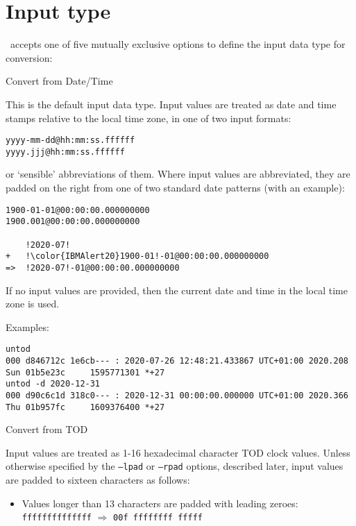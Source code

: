 \documentclass[a4paper,12pt,oneside,openany]{memoir}
\begin{document}
\section{Input type}

\tpname\ accepts one of five mutually exclusive options
to define the input data type for conversion:
\begin{description}[format=\ttfamily]
  \item[-d,--date] Convert from Date/Time

  This is the default input data type.
  Input values are treated as date and time stamps
  relative to the local time zone,
  in one of two input formats:
\begin{lstlisting}[style=plain]
yyyy-mm-dd@hh:mm:ss.ffffff
yyyy.jjj@hh:mm:ss.ffffff
\end{lstlisting}
  or `sensible' abbreviations of them.
  Where input values are abbreviated,
  they are padded on the right
  from one of two standard date patterns
  (with an example):
\begin{lstlisting}[style=plain]
1900-01-01@00:00:00.000000000
1900.001@00:00:00.000000000

    !2020-07!
+   !\color{IBMAlert20}1900-01!-01@00:00:00.000000000
=>  !2020-07!-01@00:00:00.000000000
\end{lstlisting}

  If no input values are provided,
  then the current date and time in the local time zone
  is used.

  Examples:
  \begin{lstlisting}[style=xtermsmall,numbers=none]
untod
000 d846712c 1e6cb--- : 2020-07-26 12:48:21.433867 UTC+01:00 2020.208 Sun 01b5e23c     1595771301 *+27
untod -d 2020-12-31
000 d90c6c1d 318c0--- : 2020-12-31 00:00:00.000000 UTC+01:00 2020.366 Thu 01b957fc     1609376400 *+27
  \end{lstlisting}

  \item[-o,--tod] Convert from TOD

  Input values are treated as 1-16
  hexadecimal character TOD clock values.
  Unless otherwise specified by
  the \texttt{--lpad} or \texttt{--rpad} options,
  described later,
  input values are padded to sixteen characters
  as follows:

  \begin{itemize}
    \item Values longer than 13 characters are padded
    with leading zeroes:\\[0.2\baselineskip]
    \texttt{ffffffffffffff} $ \Longrightarrow$
    \texttt{00f ffffffff fffff}


\end{itemize}
\end{description}
\end{document}
